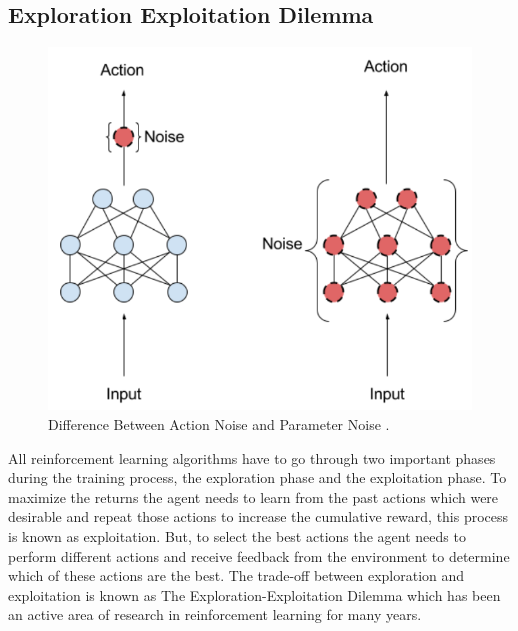 \subsection{Exploration Exploitation Dilemma}

\begin{figure}[h!]
    \centering
    \includegraphics[width=\textwidth]{images/ANPN.png}
    \caption{Difference Between Action Noise and Parameter Noise \cite{plappert2018parameter}.}
    \label{fig:ANPN}
\end{figure}

All reinforcement learning algorithms have to go through two important phases during the training process, the exploration phase and the exploitation phase. To maximize the returns the agent needs to learn from the past actions which were desirable and repeat those actions to increase the cumulative reward, this process is known as exploitation. But, to select the best actions the agent needs to perform different actions and receive feedback from the environment to determine which of these actions are the best. The trade-off between exploration and exploitation is known as The Exploration-Exploitation Dilemma which has been an active area of research in reinforcement learning for many years. \\

